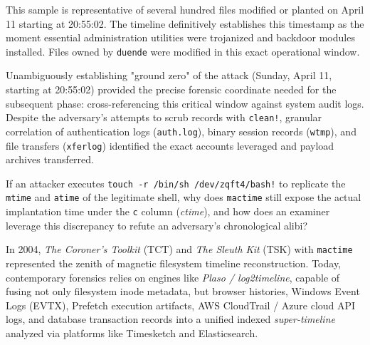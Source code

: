 \vspace{1em}

This sample is representative of several hundred files modified or planted on April 11 starting at 20:55:02. The timeline definitively establishes this timestamp as the moment essential administration utilities were trojanized and backdoor modules installed. Files owned by \texttt{duende} were modified in this exact operational window.

Unambiguously establishing "ground zero" of the attack (Sunday, April 11, starting at 20:55:02) provided the precise forensic coordinate needed for the subsequent phase: cross-referencing this critical window against system audit logs. Despite the adversary's attempts to scrub records with \texttt{clean!}, granular correlation of authentication logs (\texttt{auth.log}), binary session records (\texttt{wtmp}), and file transfers (\texttt{xferlog}) identified the exact accounts leveraged and payload archives transferred.

\begin{retoforense}
If an attacker executes \texttt{touch -r /bin/sh /dev/zqft4/bash!} to replicate the \texttt{mtime} and \texttt{atime} of the legitimate shell, why does \texttt{mactime} still expose the actual implantation time under the \texttt{c} column (\textit{ctime}), and how does an examiner leverage this discrepancy to refute an adversary's chronological alibi?
\end{retoforense}

\begin{perspectiva20}
In 2004, \textit{The Coroner's Toolkit} (TCT) and \textit{The Sleuth Kit} (TSK) with \texttt{mactime} represented the zenith of magnetic filesystem timeline reconstruction. Today, contemporary forensics relies on engines like \textit{Plaso / log2timeline}, capable of fusing not only filesystem inode metadata, but browser histories, Windows Event Logs (EVTX), Prefetch execution artifacts, AWS CloudTrail / Azure cloud API logs, and database transaction records into a unified indexed \textit{super-timeline} analyzed via platforms like Timesketch and Elasticsearch.
\end{perspectiva20}
